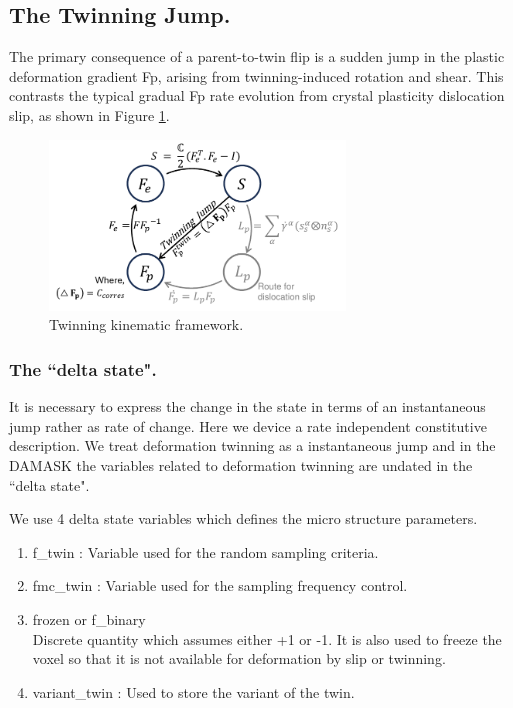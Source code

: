 \subsection{The Twinning Jump.}
The primary consequence of a parent-to-twin flip is a sudden jump in the plastic deformation gradient Fp, arising from twinning-induced rotation and shear. This contrasts the typical gradual Fp rate evolution from crystal plasticity dislocation slip, as shown in Figure \ref{fig: Kinematic_jump}.
\begin{figure}[H]
    \centering
    \includegraphics[width=0.7\textwidth]{images/Kinematic_Jump.pdf}
    \caption{Twinning kinematic framework.}
    \label{fig: Kinematic_jump}
\end{figure}
\subsubsection{The ``delta state".}
It is necessary to express the change in the state in terms of an instantaneous jump rather as rate of change. Here we device a rate independent constitutive description.
We treat deformation twinning as a instantaneous jump and in the DAMASK the variables related to deformation twinning are undated in the ``delta state".

We use 4 delta state variables which defines the micro structure parameters.
\begin{enumerate}
    \item f\_twin : Variable used for the random sampling criteria.
    \item fmc\_twin : Variable used for the sampling frequency control.
    \item frozen or f\_binary \\ Discrete quantity which assumes either +1 or -1. It is also used to freeze the voxel so that it is not available for deformation by slip or twinning.
    \item variant\_twin : Used to store the variant of the twin.
\end{enumerate}

